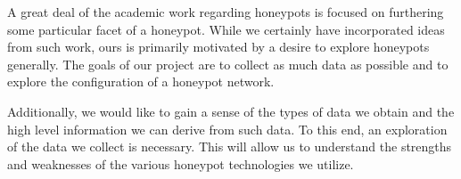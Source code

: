 %

A great deal of the academic work regarding honeypots is focused on furthering some particular facet of a honeypot. While we certainly have incorporated ideas from such work, ours is primarily motivated by a desire to explore honeypots generally. The goals of our project are to collect as much data as possible and to explore the configuration of a honeypot network.

Additionally, we would like to gain a sense of the types of data we obtain and the high level information we can derive from such data. To this end, an exploration of the data we collect is necessary. This will allow us to understand the strengths and weaknesses of the various honeypot technologies we utilize. 


